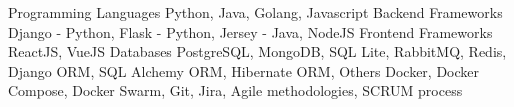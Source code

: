 %
%
%

    \begin{keywords}
        \keywordsentry
            {Programming Languages}
            {
                Python,
                Java,
                Golang,
                Javascript
            }
        \keywordsentry
            {Backend Frameworks}
            {
                Django - Python,
                Flask - Python,
                Jersey - Java,
                NodeJS
            }
        \keywordsentry
            {Frontend Frameworks}
            {
                ReactJS,
                VueJS
            }
        \keywordsentry
            {Databases}
            {
                PostgreSQL,
                MongoDB,
                SQL Lite,
                RabbitMQ,
                Redis,
                Django ORM,
                SQL Alchemy ORM,
                Hibernate ORM,
            }
        \keywordsentry
            {Others}
            {
            	Docker,
            	Docker Compose,
            	Docker Swarm,
                Git,
                Jira,
                Agile methodologies,
                SCRUM process
            }
    \end{keywords}
